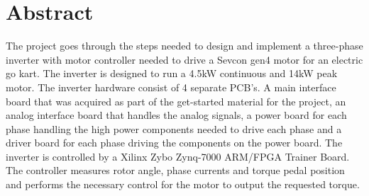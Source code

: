 \section{Abstract}

The project goes through the steps needed to design and implement a three-phase inverter with motor controller needed to drive a Sevcon gen4 motor for an electric go kart. 
The inverter is designed to run a 4.5kW continuous and 14kW peak motor. The inverter hardware consist of 4 separate PCB's. A main interface board that was acquired as part of the get-started material for the project, an analog interface board that handles the analog signals, a power board for each phase handling the high power components needed to drive each phase and a driver board for each phase driving the components on the power board. 
The inverter is controlled by a Xilinx Zybo Zynq-7000 ARM/FPGA Trainer Board. The controller measures rotor angle, phase currents and torque pedal position and performs the necessary control for the motor to output the requested torque. 









